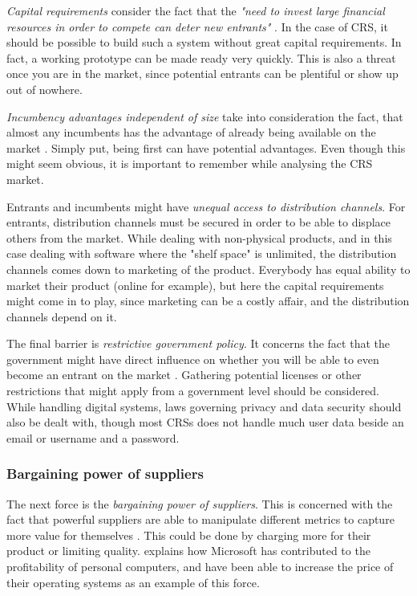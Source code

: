 \emph{Capital requirements} consider the fact that the \emph{"need to invest large financial resources in order to compete can deter new entrants"} \cite[p.~81]{porter2008five}. In the case of CRS, it should be possible to build such a system without great capital requirements. In fact, a working prototype can be made ready very quickly. This is also a threat once you are in the market, since potential entrants can be plentiful or show up out of nowhere.

\emph{Incumbency advantages independent of size} take into consideration the fact, that almost any incumbents has the advantage of already being available on the market \cite[p.~81]{porter2008five}. Simply put, being first can have potential advantages. Even though this might seem obvious, it is important to remember while analysing the CRS market. 

Entrants and incumbents might have \emph{unequal access to distribution channels}. For entrants, distribution channels must be secured in order to be able to displace others from the market. While dealing with non-physical products, and in this case dealing with software where the "shelf space" is unlimited, the distribution channels comes down to marketing of the product. Everybody has equal ability to market their product (online for example), but here the capital requirements might come in to play, since marketing can be a costly affair, and the distribution channels depend on it.

The final barrier is \emph{restrictive government policy}. It concerns the fact that the government might have direct influence on whether you will be able to even become an entrant on the market \cite[p.~82]{porter2008five}. Gathering potential licenses or other restrictions that might apply from a government level should be considered. While handling digital systems, laws governing privacy and data security should also be dealt with, though most CRSs does not handle much user data beside an email or username and a password.%

\subsubsection*{Bargaining power of suppliers}
The next force is the \emph{bargaining power of suppliers}. This is concerned with the fact that powerful suppliers are able to manipulate different metrics to capture more value for themselves \cite[p.~82]{porter2008five}. This could be done by charging more for their product or limiting quality.  explains how Microsoft has contributed to the profitability of personal computers, and have been able to increase the price of their operating systems as an example of this force.


